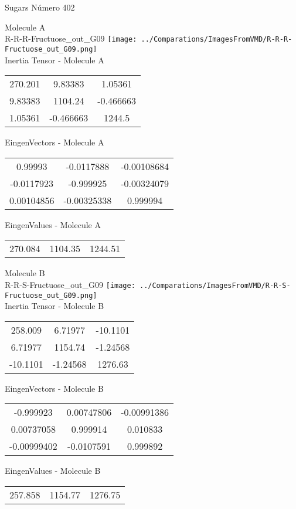 \vtab[-2cm]
\begin{center}
{\large Sugars \tab Número 402}
\end{center}
\begin{multicols}{2}
\begin{center}

Molecule A \\ 
R-R-R-Fructuose\_out\_G09
\texttt{[image: ../Comparations/ImagesFromVMD/R-R-R-Fructuose\_out\_G09.png]}
\\
Inertia Tensor - Molecule A \\
\vtab

\begin{tabular}{|c c c|}
270.201	 & 	9.83383	 & 	1.05361	 \\
9.83383	 & 	1104.24	 & 	-0.466663	 \\
1.05361	 & 	-0.466663	 & 	1244.5
\end{tabular}

\vtab
 EingenVectors - Molecule A     \\
\vtab
\begin{tabular}{|c c c|}
0.99993	 & 	-0.0117888	 & 	-0.00108684	 \\
-0.0117923	 & 	-0.999925	 & 	-0.00324079	 \\
0.00104856	 & 	-0.00325338	 & 	0.999994
\end{tabular}

\vtab
 EingenValues - Molecule A     \\
\vtab
\begin{tabular}{|c c c|}
270.084	 & 	1104.35	 & 	1244.51	 \\
\end{tabular}
\columnbreak

Molecule B \\ 
R-R-S-Fructuose\_out\_G09
\texttt{[image: ../Comparations/ImagesFromVMD/R-R-S-Fructuose\_out\_G09.png]}
\\
Inertia Tensor - Molecule B \\
\vtab

\begin{tabular}{|c c c|}
258.009	 & 	6.71977	 & 	-10.1101	 \\
6.71977	 & 	1154.74	 & 	-1.24568	 \\
-10.1101	 & 	-1.24568	 & 	1276.63
\end{tabular}

\vtab
 EingenVectors - Molecule B     \\
\vtab
\begin{tabular}{|c c c|}
-0.999923	 & 	0.00747806	 & 	-0.00991386	 \\
0.00737058	 & 	0.999914	 & 	0.010833	 \\
-0.00999402	 & 	-0.0107591	 & 	0.999892
\end{tabular}

\vtab
 EingenValues - Molecule B     \\
\vtab
\begin{tabular}{|c c c|}
257.858	 & 	1154.77	 & 	1276.75	 \\
\end{tabular}

\end{center}
\end{multicols}
